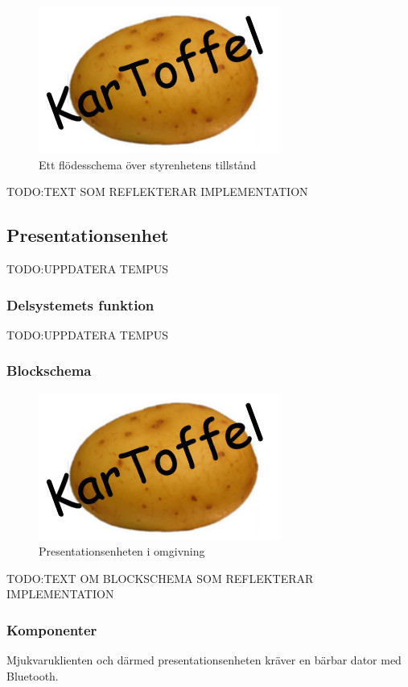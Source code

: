 \documentclass{article}
\begin{document}
\begin{figure}[H]
\centering
\includegraphics[scale=0.6]{Logo}
\caption{Ett flödesschema över styrenhetens tillstånd}
\label{fig:styrenhet_flowchart}
\end{figure}

TODO:TEXT SOM REFLEKTERAR IMPLEMENTATION

\subsection{Presentationsenhet}
TODO:UPPDATERA TEMPUS

\subsubsection{Delsystemets funktion}
TODO:UPPDATERA TEMPUS


\subsubsection{Blockschema}

\begin{figure}[H]
\includegraphics[scale=0.37]{Logo}
\caption{Presentationsenheten i omgivning}
\label{fig:Oversikt_presentationsenhet3}
\end{figure}

TODO:TEXT OM BLOCKSCHEMA SOM REFLEKTERAR IMPLEMENTATION

\subsubsection{Komponenter}
Mjukvaruklienten och därmed presentationsenheten kräver en bärbar dator med Bluetooth. 
\end{document}
